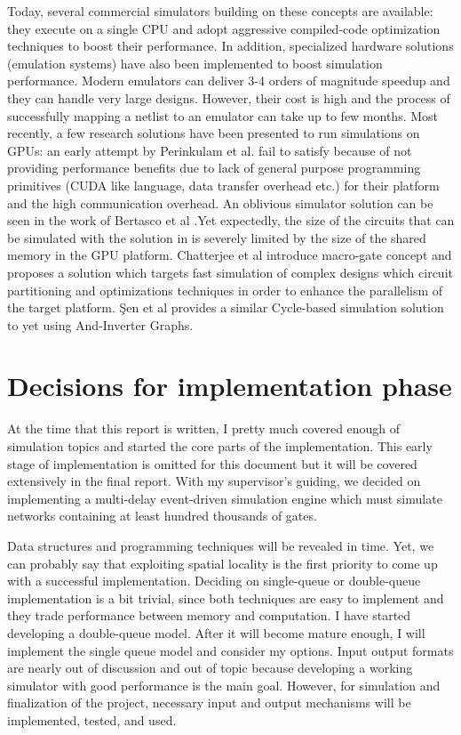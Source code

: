 \documentclass[a4paper,onesided,12pt]{report}
\begin{document}
Today, several commercial simulators building on these concepts
are available: they execute on a single CPU and adopt aggressive
compiled-code optimization techniques to boost their performance.
In addition, specialized hardware solutions (emulation systems)
have also been implemented to boost simulation performance.
 Modern emulators can deliver 3-4 orders of magnitude
speedup and they can handle very large designs. However, their
cost is high and the process of successfully mapping
a netlist to an emulator can take up to few months.
Most recently, a few research solutions have been presented to
run simulations on GPUs: an early attempt by Perinkulam et al.\cite{perinkulam} fail to satisfy because of not providing performance benefits due to lack of general purpose
programming primitives (CUDA like language, data transfer overhead etc.) for their platform and the high communication
overhead. An oblivious simulator solution can be seen in the work of Bertasco et al \cite{bertasco}.Yet expectedly, the size of the circuits that can be simulated with the solution in \cite{bertasco} is severely limited by the size of the shared memory in the GPU platform.
Chatterjee et al\cite{chatterjee} introduce macro-gate concept and proposes a solution which targets fast simulation of complex designs which circuit partitioning and optimizations techniques in order to enhance the parallelism of the target platform. Şen et al\cite{sen} provides a similar Cycle-based simulation solution to \cite{chatterjee} yet using And-Inverter Graphs.
 
 \chapter{Decisions for implementation phase}
 \label{chapter:futurework}
 
At the time that this report is written, I pretty much covered enough of simulation topics and started the core parts of the implementation. This early stage of implementation is omitted for this document but it will be covered extensively in the final report. With my supervisor's guiding, we decided on implementing a multi-delay event-driven simulation engine which must simulate networks containing at least hundred thousands of gates. 

Data structures and programming techniques will be revealed in time. Yet, we can probably say that  exploiting spatial locality is the first priority to come up with a successful implementation. Deciding on single-queue or double-queue implementation is a bit trivial, since both techniques are easy to implement and they trade performance between memory and computation. I have started developing a double-queue model. After it will become mature enough, I will implement the single queue model and consider my options. Input output formats are nearly out of discussion and out of topic because developing a working simulator with good performance is the main goal. However, for simulation and finalization of the project, necessary input and output mechanisms will be implemented, tested, and used.
\end{document}
